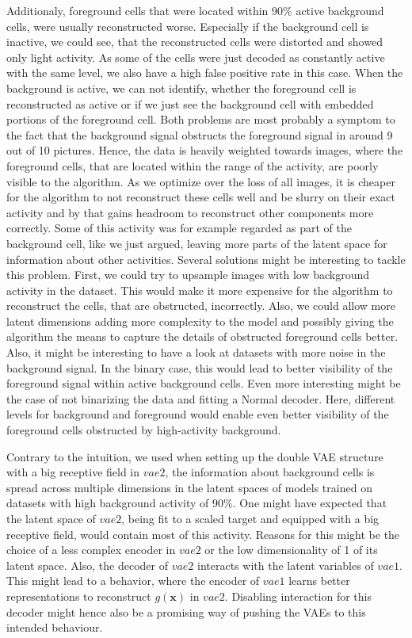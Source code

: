 \documentclass[12pt]{report}
\theoremstyle{definition}
\begin{document}
Additionaly, foreground cells that were located within 90\% active background cells, were usually reconstructed worse. Especially if the background cell is inactive, we could see, that the reconstructed cells were distorted and showed only light activity. As some of the cells were just decoded as constantly active with the same level, we also have a high false positive rate in this case. When the background is active, we can not identify, whether the foreground cell is reconstructed as active or if we just see the background cell with embedded portions of the foreground cell.
Both problems are most probably a symptom to the fact that the background signal obstructs the foreground signal in around 9 out of 10 pictures. Hence, the data is heavily weighted towards images, where the foreground cells, that are located within the range of the activity, are poorly visible to the algorithm. As we optimize over the loss of all images, it is cheaper for the algorithm to not reconstruct these cells well and be slurry on their exact activity and by that gains headroom to reconstruct other components more correctly. Some of this activity was for example regarded as part of the background cell, like we just argued, leaving more parts of the latent space for information about other activities. Several solutions might be interesting to tackle this problem. First, we could try to upsample images with low background activity in the dataset. This would make it more expensive for the algorithm to reconstruct the cells, that are obstructed, incorrectly. Also, we could allow more latent dimensions adding more complexity to the model and possibly giving the algorithm the means to capture the details of obstructed foreground cells better. Also, it might be interesting to have a look at datasets with more noise in the background signal. In the binary case, this would lead to better visibility of the foreground signal within active background cells. Even more interesting might be the case of not binarizing the data and fitting a Normal decoder. Here, different levels for background and foreground would enable even better visibility of the foreground cells obstructed by high-activity background.

Contrary to the intuition, we used when setting up the double VAE structure with a big receptive field in $vae2$, the information about background cells is spread across multiple dimensions in the latent spaces of models trained on datasets with high background activity of 90\%. One might have expected that the latent space of $vae2$, being fit to a scaled target and equipped with a big receptive field, would contain most of this activity. Reasons for this might be the choice of a less complex encoder in $vae2$ or the low dimensionality of 1 of its latent space. Also, the decoder of $vae2$ interacts with the latent variables of $vae1$. This might lead to a behavior, where the encoder of $vae1$ learns better representations to reconstruct $g(\mathbf{x})$ in $vae2$. Disabling interaction for this decoder might hence also be a promising way of pushing the VAEs to this intended behaviour.
\end{document}

